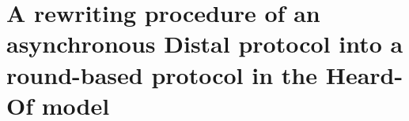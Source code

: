 \section{A rewriting procedure of an asynchronous Distal protocol into a round-based protocol in the Heard-Of model}
\label{async2seq:procedure}

